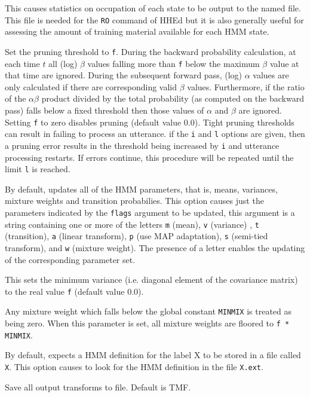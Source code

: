 \begin{optlist}
   This causes statistics on occupation of each
      state to be output to the named file.  This file
      is needed for the {\tt RO} command of HHEd but it is also
      generally useful for assessing the amount of training material
      available for each HMM state.
      
   Set the pruning threshold to {\tt f}.  During the 
      backward probability calculation, at
      each time $t$ 
      all (log) $\beta$ values falling more than {\tt f} below the
      maximum $\beta$ value at that time are ignored.  During the
      subsequent forward pass, (log) $\alpha$ values are only
      calculated if there are corresponding valid $\beta$ values.
      Furthermore, if the ratio of the $ \alpha \beta $ product divided
      by the total probability (as computed on the backward pass)
      falls below a fixed threshold then those values of $\alpha$
      and $\beta$ are ignored. Setting {\tt f} to zero disables
      pruning  (default value 0.0).  Tight pruning thresholds can
       result in  failing to process an utterance.
      if the {\tt i} and {\tt l} options are given, then a pruning
      error results in the threshold being increased by {\tt i} and
      utterance processing restarts.  If errors continue, this procedure will 
      be repeated until the limit {\tt l} is reached.
      
   By default,  updates all of the HMM parameters,
      that is, means, variances, mixture weights and 
      transition probabilies. This 
      option causes just the parameters indicated by the {\tt flags}
      argument to be updated, this argument is a string containing one
      or more of the letters {\tt m} (mean), {\tt v} (variance) ,
      {\tt t} (transition), {\tt a} (linear transform), {\tt p} (use 
	MAP adaptation), {\tt s} (semi-tied transform), and {\tt w} (mixture weight).  The 
      presence of a letter enables
      the updating of the corresponding parameter set.

    This sets the minimum variance (i.e. diagonal element of
      the covariance matrix) to the real value {\tt f} (default value
      0.0).

    Any mixture weight which falls below the global
            constant {\tt MINMIX} is treated as being zero.
      When this parameter is  set,  all mixture weights  are floored
      to {\tt f * MINMIX}.
      
    By default,  expects a HMM definition for 
      the label X to be stored in a file called {\tt X}.  This
      option causes  to look for the HMM definition in the
      file {\tt X.ext}.

   Save all output transforms to file. Default
	is TMF.

\stdoptB
\stdoptE
\stdoptF
\stdoptG
\stdoptH
\stdoptI
\stdoptJ
\stdoptK
\stdoptL
\stdoptM
\stdoptX

\end{optlist}


